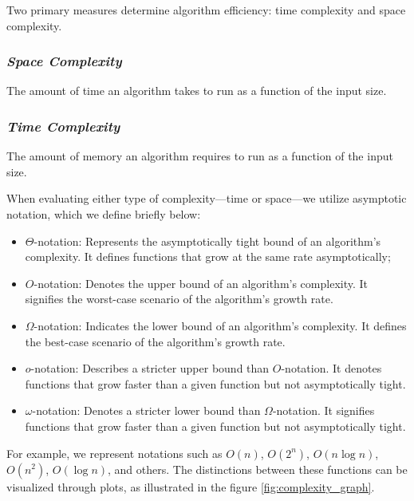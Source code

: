 \documentclass[a4paper,10pt]{article}
\begin{document}
Two primary measures determine algorithm efficiency: \colorbox{color3}{time complexity} and \colorbox{color3}{space complexity}.

\subsubsection{\textit{Space Complexity}}
The amount of \colorbox{color3}{time} an algorithm takes to run as a function of the input size.


\subsubsection{\textit{Time Complexity}}
The amount of \colorbox{color3}{memory} an algorithm requires to run as a function of the input size.

\vspace{0.5cm}
When evaluating either type of complexity—time or space—we utilize asymptotic notation, which we define briefly below:

\begin{itemize}
    \item $\Theta$-notation: Represents the asymptotically tight bound of an algorithm's complexity. It defines functions that grow at the same rate asymptotically;
    \item $O$-notation: Denotes the upper bound of an algorithm's complexity. It signifies the worst-case scenario of the algorithm's growth rate.
    \item $\Omega$-notation: Indicates the lower bound of an algorithm's complexity. It defines the best-case scenario of the algorithm's growth rate.
    \item $o$-notation: Describes a stricter upper bound than $O$-notation. It denotes functions that grow faster than a given function but not asymptotically tight.
    \item $\omega$-notation: Denotes a stricter lower bound than $\Omega$-notation. It signifies functions that grow faster than a given function but not asymptotically tight.
\end{itemize}

For example, we represent notations such as $O(n)$, $O(2^n)$, $O(n \log n)$, $O(n^2)$, $O(\log n)$, and others. The distinctions between these functions can be visualized through plots, as illustrated in the figure \ref{fig:complexity_graph}.
\end{document}
